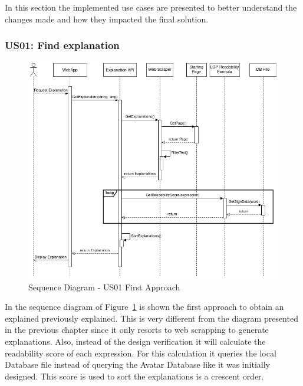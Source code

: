 In this section the implemented use cases are presented to better understand the changes made and how they impacted the final solution.

\subsubsection{US01: Find explanation}

\begin{figure}[H]
\centering
\includegraphics[scale=0.45]{ch5/assets/US01_SD_Implement_Ap1.png}
\caption[Sequence Diagram US01 First Approach]{Sequence Diagram - US01 First Approach}
\label{fig:uc01Imp1}
\end{figure}

In the sequence diagram of Figure~\ref{fig:uc01Imp1} is shown the first approach to obtain an explained previously explained.
This is very different from the diagram presented in the previous chapter since it only resorts to web scrapping to generate explanations.
Also, instead of the design verification it will calculate the readability score of each expression.
For this calculation it queries the local Database file instead of querying the Avatar Database like it was initially designed.
This score is used to sort the explanations is a crescent order.


